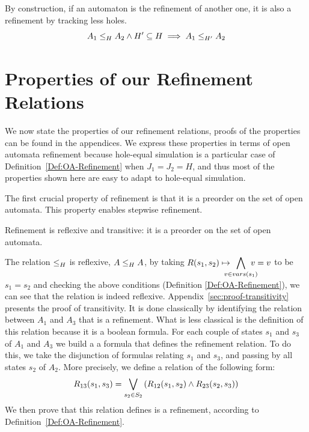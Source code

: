 \documentclass[runningheads]{llncs}
\begin{document}

\begin{lemma} By construction, if an automaton is the refinement of another one, it is also a refinement by tracking less holes.
\[\wrel{A_1}{A_2}{H} \land H'\subseteq H \implies \wrel{A_1}{A_2}{H'}\]
\end{lemma}


\section{Properties of our Refinement Relations}\label{sec:prop}
We now  state the properties of our refinement relations, proofs of the properties can be found in the appendices. We express these properties in terms of open automata refinement because hole-equal simulation is a particular case of Definition~\ref{Def:OA-Refinement} when  $J_1=J_2=H$, and thus most of the properties shown here are easy to adapt to hole-equal simulation.

The first crucial property of  refinement  is that it is  a  preorder on the set of open automata. This property enables stepwise refinement.


\begin{theorem}
Refinement   is reflexive  and  transitive:  it  is  a  preorder on the set of open automata.
\end{theorem}


The relation  \(\wrel{}{}{H}\) is reflexive,  \(\wrel{A}{A}{H}\),  by taking $R\mpar{s_1, s_2} \mapsto \displaystyle\bigwedge_\subbox{v \in vars(s_1)} {v=v}$ to be $s_1= s_2$  and checking the above conditions (Definition \ref{Def:OA-Refinement}), we can see that the relation is indeed reflexive.
%
Appendix~\ref{sec:proof-transitivity} presents the proof of transitivity. It is done classically by identifying the relation between $A_1$ and $A_3$ that is a refinement. What is less classical is the definition of this relation because it is a boolean formula. For each couple of states  $s_1$ and $s_3$ of $A_1$ and $A_3$ we build a a formula that defines the refinement relation. To do this, we take the disjunction of formulas relating $s_1$ and $s_3$, and passing by all states $s_2$ of $A_2$. More precisely, we define a relation of the following form:
  \[R_{13}(s_1,s_3)=\bigvee_{s_2\in S_2}\mpar{R_{12}(s_1,s_2) \land R_{23}(s_2,s_3) } \]
We then prove that this relation defines is a refinement, according to Definition~\ref{Def:OA-Refinement}.
\end{document}
